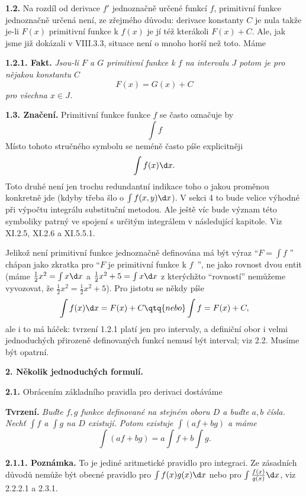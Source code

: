 \documentclass[12pt]{article}
\begin{document}
{ {\bf 1.2.} Na rozdíl od derivace $f'$ jednoznačně určené funkcí $f$, primitivní funkce jednoznačně určená není, ze zřejmého důvodu: derivace konstanty $C$ je nula takže je-li $F(x)$ primitivní funkce k $f(x)$ je jí též kterákoli
 $F(x)+C$. Ale, jak jsme již dokázali v VIII.3.3, situace není o mnoho horší než toto. Máme
 \medskip
 
 {\bf 1.2.1. Fakt.} {\em Jsou-li $F$ a $G$  primitivní funkce k $f$ na intervalu $J$ potom je pro nějakou konstantu $C$ 
 $$
 F(x)=G(x)+C
 $$
 pro všechna $x\in J$.}
 
 \bigskip
 
 {\bf 1.3. Značení.} Primitivní funkce funkce $f$ se často označuje
 by
 $$
 \int f
 $$
 Místo tohoto stručného symbolu se neméně často píše explicitněji
 $$
 \int f(x)\d x.
 $$
 Toto druhé není jen trochu redundantní indikace toho o jakou proměnou konkretně jde (kdyby třeba šlo o $\int f(x,y)\d x$). V sekci 4 to bude velice výhodné při výpočtu integrálu substituční metodou. Ale ještě víc bude význam této symboliky  patrný ve spojení s určitým integrálem v následující kapitole. Viz XI.2.5, XI.2.6 a XI.5.5.1.
 
 Jelikož není primitivní funkce jednoznačně definována má být výraz ``$F=\int f $ '' chápan jako zkratka pro ``$F$ je primitivní funkce k $f$\ '', ne jako rovnost dvou entit (máme
 $\frac12 x^2=\int x\d x$ a $\frac12 x^2 +5=\int x\d x$ z kterýchžto ``rovností'' nemůžeme vyvozovat, že $\frac12 x^2=\frac12 x^2+5$). 
 Pro jistotu se někdy píše
 $$
 \int f(x)\d x=F(x)+C \qtq{nebo} \int f=F(x)+C, 
 $$
 ale i to má háček: tvrzení 1.2.1 platí jen pro intervaly, a definiční obor i velmi jednoduchých přirozeně definovaných funkcí nemusí být interval; viz 2.2. Musíme být opatrní.
 
  \vskip10mm
 
 {\large\bf 2. Několik jednoduchých formulí.} 
 
  
 \bigskip
 
 {\bf 2.1.} Obrácením základního pravidla pro derivaci dostáváme 
 
 \medskip
 
 {\bf Tvrzení.} {\em Buďte $f,g$ funkce definované na stejném oboru $D$ a buďte $a,b$ čísla. Nechť $\int f$ a $\int g$ na $D$ existují. Potom existuje 
 $\int(af+bg)$  a máme
 $$
 \int(af+bg)=a\int f+ b\int g.
 $$}
 
 \medskip
 
 {\bf 2.1.1. Poznámka.} To je jediné aritmetické pravidlo pro integraci. Ze zásadních důvodů nemůže být obecné pravidlo pro $\int f(x)g(x)\d x$ nebo pro 
  $\int \frac{f(x)}{g(x)}\d x$, viz 2.2.2.1 a 2.3.1.
  
}
\end{document}
